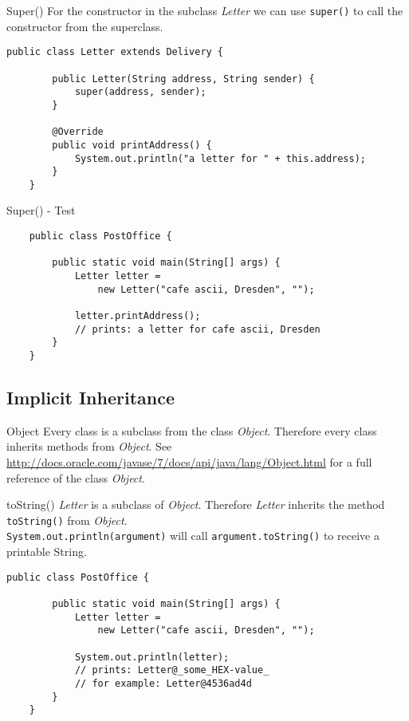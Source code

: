\begin{frame}[fragile]{Super()}
	For the constructor in the subclass \emph{Letter} we can use \texttt{super()} to call the constructor
	from the superclass.
	\begin{lstlisting}[escapechar=!]
	public class Letter extends Delivery {

	    public Letter(String address, String sender) {
	        super(address, sender);
	    }
	
	    @Override
	    public void printAddress() {
	        System.out.println("a letter for " + this.address);    
	    }	
	}
	\end{lstlisting}
\end{frame}

\begin{frame}[fragile]{Super() - Test}
	\begin{lstlisting}
	public class PostOffice {
	    
	    public static void main(String[] args) {	    
	        Letter letter = 
	            new Letter("cafe ascii, Dresden", "");
	        
	        letter.printAddress();
	        // prints: a letter for cafe ascii, Dresden
	    }
	}
	\end{lstlisting}
\end{frame}

\subsection{Implicit Inheritance}
\begin{frame}{Object}
	Every class is a subclass from the class \emph{Object}. 
	Therefore every class inherits methods from \emph{Object}.
	\vfill
	See \scriptsize\url{http://docs.oracle.com/javase/7/docs/api/java/lang/Object.html} \normalsize for
	a full reference of the class \emph{Object}.
\end{frame}

\begin{frame}[fragile]{toString()}
	\emph{Letter} is a subclass of \emph{Object}.
	Therefore \emph{Letter} inherits the method \texttt{toString()} from \emph{Object}.\\
	\texttt{System.out.println(argument)} will call \texttt{argument.toString()} to receive
	a printable String.
	\begin{lstlisting}[escapechar=!]
	public class PostOffice {
	    
	    public static void main(String[] args) {	    
	        Letter letter = 
	            new Letter("cafe ascii, Dresden", "");
	        
	        System.out.println(letter);
	        // prints: Letter@_some_HEX-value_
	        // for example: Letter@4536ad4d
	    }
	}
	\end{lstlisting}
\end{frame}


